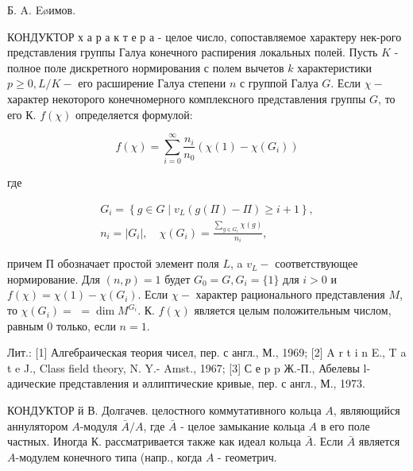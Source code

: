 \documentclass[10pt]{article}
\begin{document}
Б. A. Eøимов.



КОНДУКТОР х а р а к т е р а - целое число, сопоставляемое характеру нек-рого представления группы Галуа конечного распирения локальных полей. Пусть $K$ - полное поле дискретного нормирования с полем вычетов $k$ характеристики $p \geqslant 0, L / K-$ его расширение Галуа степени $n$ с группой Галуа $G$. Если $\chi-$ характер некоторого конечномерного комплексного представления группы $G$, то его К. $f(\chi)$ определяется формулой:



\[

f(\chi)=\sum_{i=0}^{\infty} \frac{n_{i}}{n_{0}}\left(\chi(1)-\chi\left(G_{i}\right)\right)

\]



где



\[

\begin{gathered}

G_{i}=\left\{g \in G \mid v_{L}(g(\Pi)-\Pi) \geqslant i+1\right\}, \\

n_{i}=\left|G_{i}\right|, \quad \chi\left(G_{i}\right)=\frac{\sum_{g \in G_{i}} \chi(g)}{n_{i}},

\end{gathered}

\]



причем П обозначает простой элемент поля $L$, a $v_{L}-$ соответствующее нормирование. Для $(n, p)=1$ будет $G_{0}=G, G_{i}=\{1\}$ для $i>0$ и $f(\chi)=\chi(1)-\chi\left(G_{i}\right)$. Если $\chi-$ характер рационального представления $M$, то $\chi\left(G_{i}\right)=$ $=\operatorname{dim} M^{G_{i}}$. К. $f(\chi)$ является целым положительным числом, равным 0 только, если $n=1$.



Лит.: [1] Алгебраическая теория чисел, пер. с англ., М., 1969; [2] A r t i n E., T a t e J., Class field theory, N. Y.- Amst., 1967; [3] С е p p Ж.-П., Абелевы l-адические представления и әллиптические кривые, пер. с англ., М., 1973.



КОНДУКТОР й В. Долгачев. целостного коммутативного кольца $A$, являющийся аннулятором $A$-модуля $\bar{A} / A$, где $\bar{A}$ - целое замыкание кольца $A$ в его поле частных. Иногда $К$. рассматривается также как идеал кольца $\bar{A}$. Если $\bar{A}$ является $A$-модулем конечного типа (напр., когда $A$ - геометрич.
\end{document}
